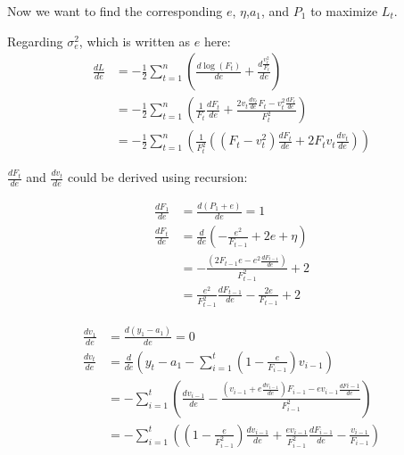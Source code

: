 \documentclass{article}
\begin{document}
\par\noindent
Now we want to find the corresponding \(e\), \(\eta\),\(a_1\), and \(P_1\) to maximize \(L_t\).
\par\noindent
Regarding \(\sigma^2_e\), which is written as \(e\) here:
\begin{align*}
    \frac{dL}{de} &= -\frac{1}{2}\sum_{t=1}^{n}(\frac{d\log(F_t)}{de} + \frac{d\frac{v_t^2}{F_t}}{de})\\
    &= -\frac{1}{2}\sum_{t=1}^{n}(\frac{1}{F_t}\frac{dF_t}{de} + \frac{2v_t\frac{dv_t}{de}F_t - v_t^2\frac{dF_t}{de}}{F_t^2})\\
    &= -\frac{1}{2}\sum_{t=1}^{n}(\frac{1}{F_t^2}((F_t - v_t^2)\frac{dF_t}{de} + 2F_tv_t\frac{dv_t}{de}))
\end{align*}

\par\noindent
\(\frac{dF_t}{de}\) and \(\frac{dv_t}{de}\) could be derived using recursion:

\par\noindent
\begin{minipage}[t]{0.4\textwidth}
    \begin{align*}
        \frac{dF_1}{de} &= \frac{d(P_1+e)}{de} = 1\\
        \frac{dF_t}{de} &= \frac{d}{de}(-\frac{e^2}{F_{t-1}} +2e+\eta)\\
        &= -\frac{(2F_{t-1}e-e^2\frac{dF_{t-1}}{de})}{F_{t-1}^2}+2\\
        &= \frac{e^2}{F_{t-1}^2}\frac{dF_{t-1}}{de}-\frac{2e}{F_{t-1}}+2
    \end{align*}
\end{minipage}
\hfill
\begin{minipage}[t]{0.4\textwidth}
    \begin{align*}
        \frac{dv_1}{de} &= \frac{d(y_1-a_1)}{de} = 0\\
        \frac{dv_t}{de} &= \frac{d}{de}(y_t - a_1 - \sum_{i=1}^{t}(1-\frac{e}{F_{i-1}})v_{i-1})\\
        &= - \sum_{i=1}^{t}(\frac{dv_{i-1}}{de}-\frac{(v_{i-1}+e\frac{dv_{i-1}}{de})F_{i-1}-ev_{i-1}\frac{dF{i-1}}{de}}{F^2_{i-1}})\\
        &= - \sum_{i=1}^{t}((1-\frac{e}{F^2_{i-1}})\frac{dv_{i-1}}{de}+\frac{ev_{i-1}}{F^2_{i-1}}\frac{dF_{i-1}}{de}-\frac{v_{i-1}}{F_{i-1}})
    \end{align*}
\end{minipage}\\
\end{document}

